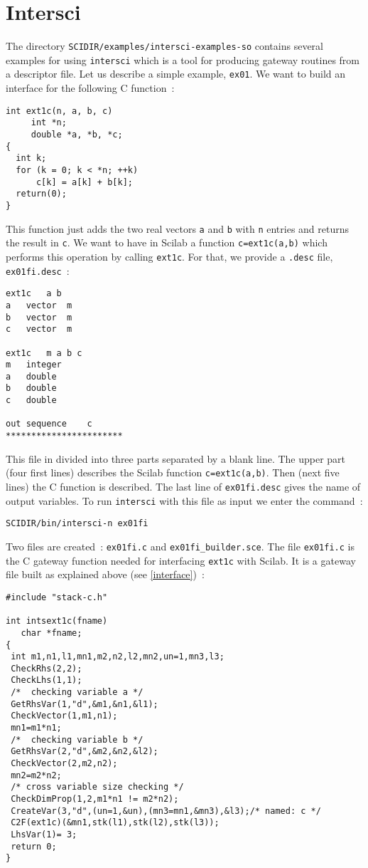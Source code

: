 \section{Intersci}
The directory \verb!SCIDIR/examples/intersci-examples-so! contains
several examples for using \verb!intersci! which is a tool for
producing gateway routines from a descriptor file.
Let us describe a simple example, \verb!ex01!.
We want to build an interface for the following C function~:
\begin{verbatim}
int ext1c(n, a, b, c)
     int *n;
     double *a, *b, *c;
{   
  int k;
  for (k = 0; k < *n; ++k) 
      c[k] = a[k] + b[k];
  return(0);
}
\end{verbatim}
This function just adds the two real vectors \verb!a! and \verb!b! 
with \verb!n! entries and returns the result in \verb!c!.
We want to have in Scilab a function \verb!c=ext1c(a,b)! which
performs this operation by calling  \verb!ext1c!.
For that, we provide a \verb!.desc! file, \verb!ex01fi.desc!~:
\begin{verbatim}
ext1c	a b 
a 	vector	m
b 	vector	m
c	vector  m 

ext1c   m a b c 
m	integer 
a	double 
b	double 
c	double 

out	sequence	c
***********************
\end{verbatim}
\noindent
This file in divided into three parts separated by a blank line. 
The upper part (four first lines) describes the Scilab function 
\verb!c=ext1c(a,b)!.
Then (next five lines) the C function is described. The last line of 
\verb!ex01fi.desc! gives the name of output variables. 
To run \verb!intersci! with this file as input we enter the command~:
\begin{verbatim}
SCIDIR/bin/intersci-n ex01fi
\end{verbatim}
Two files are created~: \verb!ex01fi.c! and \verb!ex01fi_builder.sce!.
The file \verb!ex01fi.c! is the C gateway function needed for interfacing
\verb!ext1c! with Scilab. It is a gateway file built as explained above 
(see \ref{interface})~:

\scriptsize
\begin{verbatim}
#include "stack-c.h"

int intsext1c(fname)
   char *fname;
{
 int m1,n1,l1,mn1,m2,n2,l2,mn2,un=1,mn3,l3;
 CheckRhs(2,2);
 CheckLhs(1,1);
 /*  checking variable a */
 GetRhsVar(1,"d",&m1,&n1,&l1);
 CheckVector(1,m1,n1);
 mn1=m1*n1;
 /*  checking variable b */
 GetRhsVar(2,"d",&m2,&n2,&l2);
 CheckVector(2,m2,n2);
 mn2=m2*n2;
 /* cross variable size checking */
 CheckDimProp(1,2,m1*n1 != m2*n2);
 CreateVar(3,"d",(un=1,&un),(mn3=mn1,&mn3),&l3);/* named: c */
 C2F(ext1c)(&mn1,stk(l1),stk(l2),stk(l3));
 LhsVar(1)= 3;
 return 0;
}
\end{verbatim}
\normalsize

